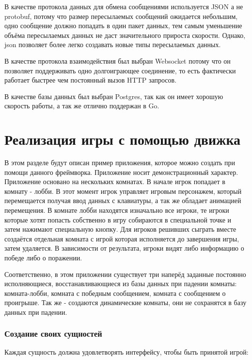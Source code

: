 \documentclass[a4paper,14pt, openany]{book}
\begin{document}
В качестве протокола данных для обмена сообщениями используется JSON а не protobuf, потому что размер пересылаемых сообщений ожидается небольшим, одно сообщение должно попадать в один пакет данных, тем самым уменьшение объёма пересылаемых данных не даст значительного прироста скорости. Однако, json позволяет более легко создавать новые типы пересылаемых данных.

В качестве протокола взаимодействия был выбран Websocket потому что он позволяет поддерживать одно долгоиграющее соединение, то есть фактически работает быстрее чем постоянный вызов HTTP запросов.

В качестве базы данных был выбран Postgres, так как он имеет хорошую скорость работы, а так же отлично поддержан в Go. 


\chapter{Реализация игры с помощью движка}

В этом разделе будут описан пример приложения, которое можно создать при помощи данного фреймворка. Приложение носит демонстрационный характер. Приложение основано на нескольких комнатах. В начале игрок попадает в комнату - лобби. В этот момент игрок управляет игровым персонажем, который перемещается получая ввод данных с клавиатуры, а так же обладает анимацией перемещения. В комнате лобби находятся изначально все игроки, те игроки которые хотят попасть собственно в игру собираются в специальной точке и затем нажимают специальную кнопку. Для игроков решивших сыграть вместе создаётся отдельная комната с игрой которая исполняется до завершения игры, затем удаляется. В зависимости от результата, игроки видят либо информацию о победе либо о поражении. 

Соответственно, в этом приложении существует три наперёд заданные постоянно исполняющиеся, восстанавливающиеся из базы данных при падении комнаты: комната-лобби, комната с победным сообщением, комната с сообщением о проигрыше. Так же - создаются динамические комнаты, они не сохранятся в базу данных при падении.  

\subsection{Создание своих сущностей}

Каждая сущность должна удовлетворять интерфейсу, чтобы быть принятой игрой:

\end{document}
